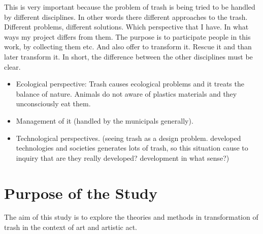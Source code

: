 
This is very important because the problem of trash is being tried to be handled by different disciplines. In other words there different approaches to the trash. Different problems, different solutions. Which perspective that I have. In what ways my project differs from them. The purpose is to participate people in this work, by collecting them etc. And also offer to transform it. Rescue it and than later transform it. In short, the difference between the other disciplines must be clear. 
\begin{itemize}
\item Ecological perspective: Trash causes ecological problems and it treats the balance of nature. Animals do not aware of plastics materials and they unconsciously eat them.
\item Management of it (handled by the municipals generally).
\item Technological perspectives. (seeing trash as a design problem. developed technologies and societies generates lots of trash, so this situation cause to inquiry that are they really developed? development in what sense?)
\end{itemize}



\section{Purpose of the Study}

The aim of this study is to explore the theories and methods in transformation of trash in the context of art and artistic act.


